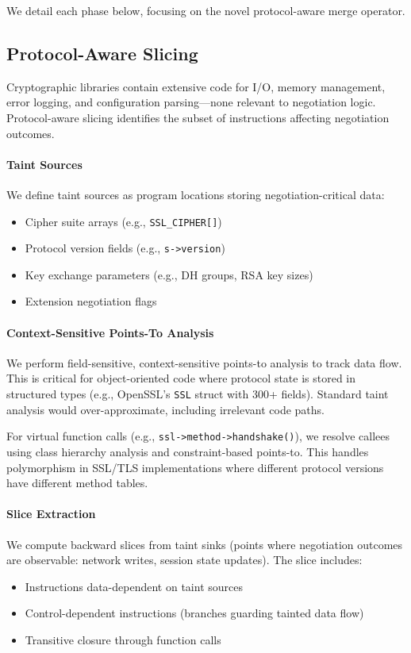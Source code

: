 \documentclass[10pt,twocolumn]{article}
\begin{document}
We detail each phase below, focusing on the novel protocol-aware merge operator.

\subsection{Protocol-Aware Slicing}
\label{sec:slicing}

Cryptographic libraries contain extensive code for I/O, memory management, error logging, and configuration parsing—none relevant to negotiation logic. Protocol-aware slicing identifies the subset of instructions affecting negotiation outcomes.

\paragraph{Taint Sources}
We define taint sources as program locations storing negotiation-critical data:
\begin{itemize}[leftmargin=*,noitemsep]
\item Cipher suite arrays (e.g., \texttt{SSL\_CIPHER[]})
\item Protocol version fields (e.g., \texttt{s->version})
\item Key exchange parameters (e.g., DH groups, RSA key sizes)
\item Extension negotiation flags
\end{itemize}

\paragraph{Context-Sensitive Points-To Analysis}
We perform field-sensitive, context-sensitive points-to analysis to track data flow. This is critical for object-oriented code where protocol state is stored in structured types (e.g., OpenSSL's \texttt{SSL} struct with 300+ fields). Standard taint analysis would over-approximate, including irrelevant code paths.

For virtual function calls (e.g., \texttt{ssl->method->handshake()}), we resolve callees using class hierarchy analysis and constraint-based points-to. This handles polymorphism in SSL/TLS implementations where different protocol versions have different method tables.

\paragraph{Slice Extraction}
We compute backward slices from taint sinks (points where negotiation outcomes are observable: network writes, session state updates). The slice includes:
\begin{itemize}[leftmargin=*,noitemsep]
\item Instructions data-dependent on taint sources
\item Control-dependent instructions (branches guarding tainted data flow)
\item Transitive closure through function calls
\end{itemize}
\end{document}
